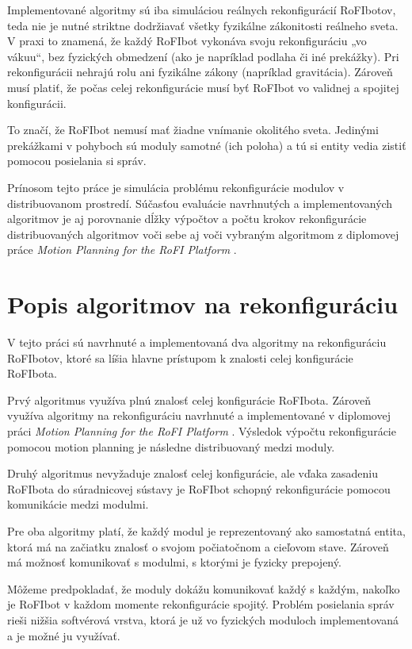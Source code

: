 \documentclass[
  printed, %
  oneside, %
  notable,   %
  nolof,     %
  nolot,     %
]{fithesis3}
\begin{document}
Implementované algoritmy sú iba simuláciou reálnych rekonfigurácií RoFIbotov, teda nie je nutné striktne dodržiavať všetky fyzikálne zákonitosti reálneho sveta. V praxi to znamená, že každý RoFIbot vykonáva svoju rekonfiguráciu „vo vákuu“, bez fyzických obmedzení (ako je napríklad podlaha či iné prekážky). Pri rekonfigurácii nehrajú rolu ani fyzikálne zákony (napríklad gravitácia). Zároveň musí platiť, že počas celej rekonfigurácie musí byť RoFIbot vo validnej a spojitej konfigurácii. 

To značí, že RoFIbot nemusí mať žiadne vnímanie okolitého sveta. Jedinými prekážkami v pohyboch sú moduly samotné (ich poloha) a tú si entity vedia zistiť pomocou posielania si správ. 

Prínosom tejto práce je simulácia problému rekonfigurácie modulov v distribuovanom prostredí. Súčasťou evaluácie navrhnutých a implementovaných algoritmov je aj porovnanie dĺžky výpočtov a počtu krokov rekonfigurácie distribuovaných algoritmov voči sebe aj voči vybraným algoritmom z diplomovej práce \textit{Motion Planning for the RoFI Platform} \cite{vozarovaMasterThesis}. 

\section{Popis algoritmov na rekonfiguráciu}
\label{sec:algoDesc}
V tejto práci sú navrhnuté a implementovaná dva algoritmy na rekonfiguráciu RoFIbotov, ktoré sa líšia hlavne prístupom k znalosti celej konfigurácie RoFIbota. 

Prvý algoritmus využíva plnú znalosť celej konfigurácie RoFIbota. Zároveň využíva algoritmy na rekonfiguráciu navrhnuté a implementované v diplomovej práci \textit{Motion Planning for the RoFI Platform} \cite{vozarovaMasterThesis}. Výsledok výpočtu rekonfigurácie pomocou motion planning je následne distribuovaný medzi moduly. 

Druhý algoritmus nevyžaduje znalosť celej konfigurácie, ale vďaka zasadeniu RoFIbota do súradnicovej sústavy je RoFIbot schopný rekonfigurácie pomocou komunikácie medzi modulmi. 

Pre oba algoritmy platí, že každý modul je reprezentovaný ako samostatná entita, ktorá má na začiatku znalosť o svojom počiatočnom a cieľovom stave. Zároveň má možnosť komunikovať s modulmi, s ktorými je fyzicky prepojený. 

Môžeme predpokladať, že moduly dokážu komunikovať každý s každým, nakoľko je RoFIbot v každom momente rekonfigurácie spojitý. Problém posielania správ rieši nižšia softvérová vrstva, ktorá je už vo fyzických moduloch implementovaná a je možné ju využívať. 
\end{document}
